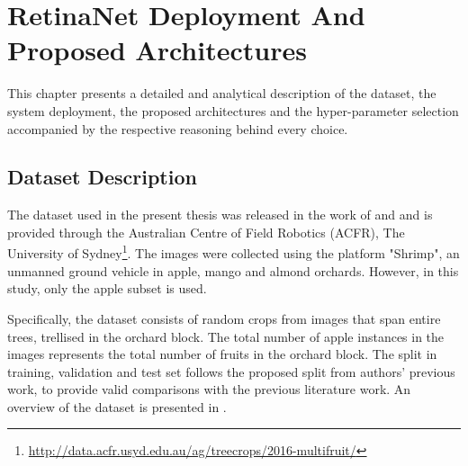 \chapter{RetinaNet Deployment And Proposed Architectures} \label{Chapter:Experiment}
This chapter presents a detailed and analytical description of the dataset, the system deployment, the proposed architectures and the hyper-parameter selection accompanied by the respective reasoning behind every choice.

\section{Dataset Description}
The dataset used in the present thesis was released in the work of \cite{bargoti2017image} and \cite{bargoti2017deep} and is provided through the Australian Centre of Field Robotics (ACFR), The University of Sydney\footnote{\url{http://data.acfr.usyd.edu.au/ag/treecrops/2016-multifruit/}}. The images were collected using the platform "Shrimp", an unmanned ground vehicle in apple, mango and almond orchards. However, in this study, only the apple subset is used.

Specifically, the dataset consists of random crops from images that span entire trees, trellised in the orchard block. The total number of apple instances in the images represents the total number of fruits in the orchard block. The split in training, validation and test set follows the proposed split from authors' previous work, to provide valid comparisons with the previous literature work. An overview of the dataset is presented in .

\begin{table}[!htb]
  \centering
  \caption{ACFR dataset description.}
  \label{ch4:tab1}
\end{table}

